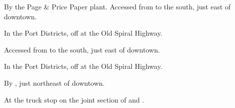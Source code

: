 
\begin{LocationList}

By the Page \& Price Paper plant. Accessed from  to the south, just east of downtown.

In the Port Districts, off  at the Old Spiral Highway.

Accessed from  to the south, just east of downtown.

In the Port Districts, off  at the Old Spiral Highway.

By , just northeast of downtown.

At the truck stop on the joint section of  and .

\end{LocationList}

